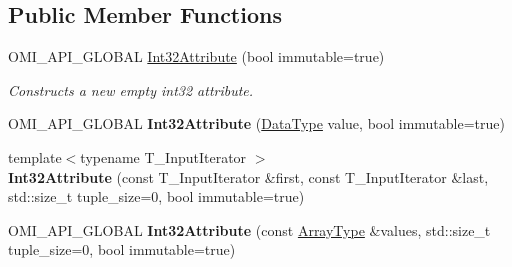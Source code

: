 \subsection*{Public Member Functions}
\begin{DoxyCompactItemize}
\item 
O\+M\+I\+\_\+\+A\+P\+I\+\_\+\+G\+L\+O\+B\+AL \hyperlink{classomi_1_1_int32_attribute_a3563bd9594cc4e47ae4eb6501446eedc}{Int32\+Attribute} (bool immutable=true)
\begin{DoxyCompactList}\small\item\em Constructs a new empty int32 attribute. \end{DoxyCompactList}\item 
O\+M\+I\+\_\+\+A\+P\+I\+\_\+\+G\+L\+O\+B\+AL {\bfseries Int32\+Attribute} (\hyperlink{classomi_1_1_int32_attribute_aaafef3adcf9a0111695451449dfa1a2d}{Data\+Type} value, bool immutable=true)\hypertarget{classomi_1_1_int32_attribute_a5ad7c9cd6d42c54e7cc2d26c181a29e9}{}\label{classomi_1_1_int32_attribute_a5ad7c9cd6d42c54e7cc2d26c181a29e9}

\item 
{\footnotesize template$<$typename T\+\_\+\+Input\+Iterator $>$ }\\{\bfseries Int32\+Attribute} (const T\+\_\+\+Input\+Iterator \&first, const T\+\_\+\+Input\+Iterator \&last, std\+::size\+\_\+t tuple\+\_\+size=0, bool immutable=true)\hypertarget{classomi_1_1_int32_attribute_a39539919b93afb3d49c60c2954322447}{}\label{classomi_1_1_int32_attribute_a39539919b93afb3d49c60c2954322447}

\item 
O\+M\+I\+\_\+\+A\+P\+I\+\_\+\+G\+L\+O\+B\+AL {\bfseries Int32\+Attribute} (const \hyperlink{classomi_1_1_int32_attribute_a09ae7167f71512dc47ef34d96bf3baf5}{Array\+Type} \&values, std\+::size\+\_\+t tuple\+\_\+size=0, bool immutable=true)\hypertarget{classomi_1_1_int32_attribute_a5586139ca5a4a48c5364394a265bdeb0}{}\label{classomi_1_1_int32_attribute_a5586139ca5a4a48c5364394a265bdeb0}


\end{DoxyCompactItemize}
